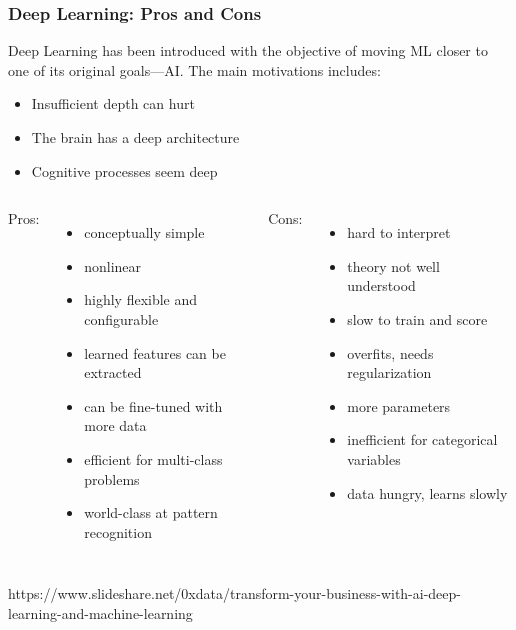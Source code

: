 \begin{frame}
  \MyLogo
  \frametitle{Deep Learning: Pros and Cons}  

\small

\begin{mdframed}[style=mystyle2]
Deep Learning has been introduced with the objective of moving ML closer to one of its original goals---AI. The main motivations includes:
%
\begin{itemize}\scriptsize\setlength\itemsep{0.2em}
\item Insufficient depth can hurt
\item The brain has a deep architecture
\item Cognitive processes seem deep
\end{itemize}
\end{mdframed}

\medskip

\begin{columns}

{\color{blue}Pros:}
\begin{itemize}\setlength\itemsep{0.2em}
\item conceptually simple
\item nonlinear 
\item highly flexible and configurable
\item learned features can be extracted
\item can be fine-tuned with more data
\item efficient for multi-class problems
\item world-class at pattern recognition
\end{itemize}

{\color{red}Cons:}
\begin{itemize}\setlength\itemsep{0.2em}
\item hard to interpret 
\item theory not well understood
\item slow to train and score
\item overfits, needs regularization
\item more parameters
\item inefficient for categorical variables
\item data hungry, learns slowly 
\end{itemize}
\end{columns}

\begin{center}
{\color{red} \scriptsize
https://www.slideshare.net/0xdata/transform-your-business-with-ai-deep-learning-and-machine-learning}
\end{center}

\end{frame}

